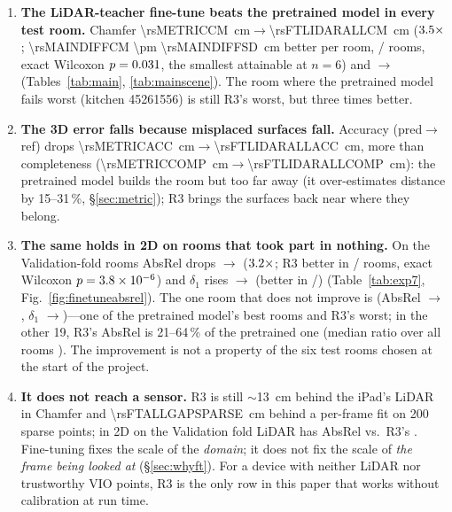 \begin{enumerate}
\item \textbf{The LiDAR-teacher fine-tune beats the pretrained model in every test room.} Chamfer
\SI{\rsMETRICCM}{cm}$\rightarrow$\SI{\rsFTLIDARALLCM}{cm} ($3.5\times$; \SI{\rsMAINDIFFCM \pm \rsMAINDIFFSD}{cm}
better per room, \rsMAINWINS/\rsMAINN{} rooms, exact Wilcoxon $p=0.031$, the smallest attainable at $n=6$) and
\fscore{} \rsMETRICF$\rightarrow$\rsFTLIDARALLF{} (Tables~\ref{tab:main}, \ref{tab:mainscene}). The room where the
pretrained model fails worst (kitchen 45261556) is still R3's worst, but three times better.
\item \textbf{The 3D error falls because misplaced surfaces fall.} Accuracy (pred$\rightarrow$ref) drops
\SI{\rsMETRICACC}{cm}$\rightarrow$\SI{\rsFTLIDARALLACC}{cm}, more than completeness
(\SI{\rsMETRICCOMP}{cm}$\rightarrow$\SI{\rsFTLIDARALLCOMP}{cm}): the pretrained model builds the room but too far away
(it over-estimates distance by 15--31\,\%, \S\ref{sec:metric}); R3 brings the surfaces back near where they belong.
\item \textbf{The same holds in 2D on rooms that took part in nothing.} On the \rsVN{} Validation-fold rooms AbsRel
drops \rsVMETRICABSREL$\rightarrow$\rsVFTALLABSREL{} ($3.2\times$; R3 better in \rsVWINS/\rsVN{} rooms, exact
Wilcoxon $p=3.8\times10^{-6}$) and $\delta_1$ rises \rsVMETRICDELTAONE$\rightarrow$\rsVFTALLDELTAONE{} (better in
\rsVWINSDELTA/\rsVN) (Table~\ref{tab:exp7}, Fig.~\ref{fig:finetuneabsrel}). The one room that does not improve is \rsVEXCEPT{}
(AbsRel \rsVEXCEPTPRE$\rightarrow$\rsVEXCEPTFT, $\delta_1$ \rsVEXCEPTDPRE$\rightarrow$\rsVEXCEPTDFT)---one of the
pretrained model's best rooms and R3's worst; in the other 19, R3's AbsRel is 21--64\,\% of the pretrained one
(median ratio over all \rsVN{} rooms \rsVMEDRATIO). The improvement is not a property of the six test rooms chosen at the start of the
project.
\item \textbf{It does not reach a sensor.} R3 is still $\sim$\SI{13}{cm} behind the iPad's LiDAR in Chamfer and
\SI{\rsFTALLGAPSPARSE}{cm} behind a per-frame fit on 200 sparse points; in 2D on the Validation fold LiDAR has AbsRel
\rsVLIDARABSREL{} vs.\ R3's \rsVFTALLABSREL. Fine-tuning fixes the scale of the \emph{domain}; it does not fix the
scale of \emph{the frame being looked at} (\S\ref{sec:whyft}). For a device with neither LiDAR nor trustworthy VIO
points, R3 is the only row in this paper that works without calibration at run time.
\end{enumerate}

